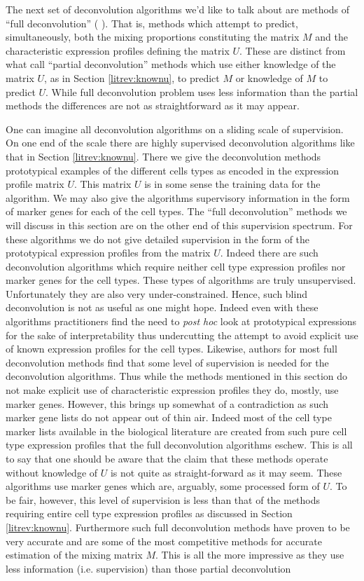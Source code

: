\documentclass[reqno,12pt,oneside]{report}\usepackage[]{graphicx}\usepackage[]{color}
\renewcommand{\citet}[1]{(\citeauthor{#1} \citeyear{#1})}
\theoremstyle{plain}
\theoremstyle{definition}
\theoremstyle{remark}
\numberwithin{theorem}{chapter}     %
\begin{document}
The next set of deconvolution algorithms we'd like to talk about are methods of ``full deconvolution'' \citet{Gaujoux2013}. That is, methods which attempt to predict, simultaneously, both the mixing proportions constituting the matrix $M$ and the characteristic expression profiles defining the matrix $U$. These are distinct from what \citeauthor{Gaujoux2013} call ``partial deconvolution'' methods which use either knowledge of the matrix $U$, as in Section \ref{litrev:knownu}, to predict $M$ or knowledge of $M$ to predict $U$. While full deconvolution problem uses less information than the partial methods the differences are not as straightforward as it may appear. 

One can imagine all deconvolution algorithms on a sliding scale of supervision. On one end of the scale there are highly supervised deconvolution algorithms like that in Section \ref{litrev:knownu}. There we give the deconvolution methods prototypical examples of the different cells types as encoded in the expression profile matrix $U$. This matrix $U$ is in some sense the training data for the algorithm. We may also give the algorithms supervisory information in the form of marker genes for each of the cell types. The ``full deconvolution'' methods we will discuss in this section are on the other end of this supervision spectrum. For these algorithms we do not give detailed supervision in the form of the prototypical expression profiles from the matrix $U$. Indeed there are such deconvolution algorithms which require neither cell type expression profiles nor marker genes for the cell types. These types of algorithms are truly unsupervised. Unfortunately they are also very under-constrained. Hence, such blind deconvolution is not as useful as one might hope. Indeed even with these algorithms practitioners find the need to \emph{post hoc} look at prototypical expressions for the sake of interpretability thus undercutting the attempt to avoid explicit use of known expression profiles for the cell types. Likewise, authors for most full deconvolution methods find that some level of supervision is needed for the deconvolution algorithms. Thus while the methods mentioned in this section do not make explicit use of characteristic expression profiles they do, mostly, use marker genes. However, this brings up somewhat of a contradiction as such marker gene lists do not appear out of thin air. Indeed most of the cell type marker lists available in the biological literature are created from such pure cell type expression profiles that the full deconvolution algorithms eschew. This is all to say that one should be aware that the claim that these methods operate without knowledge of $U$ is not quite as straight-forward as it may seem. These algorithms use marker genes which are, arguably, some processed form of $U$. To be fair, however, this level of supervision is less than that of the methods requiring entire cell type expression profiles as discussed in Section \ref{litrev:knownu}. Furthermore such full deconvolution methods have proven to be very accurate and are some of the most competitive methods for accurate estimation of the mixing matrix $M$. This is all the more impressive as they use less information (i.e. supervision) than those partial deconvolution 
\end{document}
